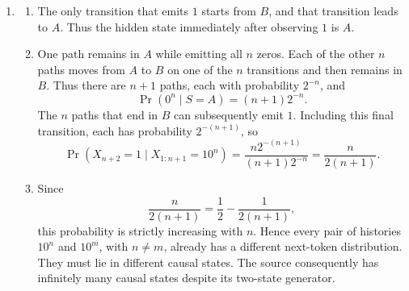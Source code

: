 \begin{solution}[ex:p2-3]
\begin{enumerate}
\begin{enumerate}
            These four states are distinct. The state represented by $01$
            cannot emit $0$, whereas the other three can. The continuation
            $10$ is impossible after $0$ but possible after $\emptyset$ and
            $1$. Finally, $\epsilon(\emptyset)\neq\epsilon(1)$ by assumption.
            Hence the displayed representatives are also shortest.

          \item Appending each possible symbol gives the causal-state update:
            \[
              \begin{array}{c|cc}
                \text{state} & 0 & 1\\
                \hline
                \epsilon(\emptyset) & \epsilon(0) & \epsilon(1)\\
                \epsilon(1)         & \epsilon(0) & \epsilon(\emptyset)\\
                \epsilon(0)         & \epsilon(0) & \epsilon(01)\\
                \epsilon(01)        & \text{--}   & \epsilon(0)
              \end{array}
            \]
            Here a dash denotes an impossible extension. Drawing one node for
            each row and the indicated symbol-labelled edges gives the
            required automaton.
        \end{enumerate}

      \item
        \begin{enumerate}
          \item The only transition that emits $1$ starts from $B$, and that
            transition leads to $A$. Thus the hidden state immediately after
            observing $1$ is $A$.

          \item One path remains in $A$ while emitting all $n$ zeros. Each of
            the other $n$ paths moves from $A$ to $B$ on one of the $n$
            transitions and then remains in $B$. Thus there are $n+1$ paths,
            each with probability $2^{-n}$, and
            \[
              \Pr(0^n\mid S=A)=(n+1)2^{-n}.
            \]
            The $n$ paths that end in $B$ can subsequently emit $1$. Including
            this final transition, each has probability $2^{-(n+1)}$, so
            \[
              \Pr(X_{n+2}=1\mid X_{1:n+1}=10^n)
                =\frac{n2^{-(n+1)}}{(n+1)2^{-n}}
                =\frac{n}{2(n+1)}.
            \]

          \item Since
            \[
              \frac{n}{2(n+1)}=\frac12-\frac{1}{2(n+1)},
            \]
            this probability is strictly increasing with $n$. Hence every pair
            of histories $10^n$ and $10^m$, with $n\neq m$, already has a
            different next-token distribution. They must lie in different
            causal states. The source consequently has infinitely many causal
            states despite its two-state generator.
        \end{enumerate}
    \end{enumerate}
\end{solution}

